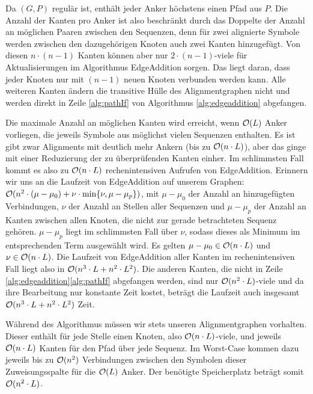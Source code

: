 \begin{beweis}
	Da $(G,P)$ regulär ist, enthält jeder Anker höchstens einen Pfad aus $P$. Die Anzahl der Kanten pro Anker ist also beschränkt durch das Doppelte der Anzahl an möglichen Paaren zwischen den Sequenzen, denn für zwei alignierte Symbole werden zwischen den dazugehörigen Knoten auch zwei Kanten hinzugefügt. Von diesen $n\cdot (n-1)$ Kanten können aber nur $2\cdot (n-1)$-viele für Aktualisierungen im Algorithmus \textrm{EdgeAddition} sorgen. Das liegt daran, dass jeder Knoten nur mit $(n-1)$ neuen Knoten verbunden werden kann. Alle weiteren Kanten ändern die transitive Hülle des Alignmentgraphen nicht und werden direkt in Zeile \ref{alg:pathIf} von Algorithmus \ref{alg:edgeaddition} abgefangen.
	
	Die maximale Anzahl an möglichen Kanten wird erreicht, wenn $\mathcal{O}(L)$ Anker vorliegen, die jeweils Symbole aus möglichst vielen Sequenzen enthalten. Es ist gibt zwar Alignments mit deutlich mehr Ankern (bis zu $\mathcal{O}(n\cdot L)$), aber das ginge mit einer Reduzierung der zu überprüfenden Kanten einher. Im schlimmsten Fall kommt es also zu $\mathcal{O}(n\cdot L)$ rechenintensiven Aufrufen von \textrm{EdgeAddition}. Erinnern wir uns an die Laufzeit von \textrm{EdgeAddition} auf unserem Graphen: $\mathcal{O}(n^2 \cdot (\mu - \mu_0) + \nu \cdot \min\{\nu, \mu - \mu_p\})$, mit $\mu - \mu_0$ der Anzahl an hinzugefügten Verbindungen, $\nu$ der Anzahl an Stellen aller Sequenzen und $\mu - \mu_p$ der Anzahl an Kanten zwischen allen Knoten, die nicht zur gerade betrachteten Sequenz gehören. $\mu - \mu_p$ liegt im schlimmsten Fall über $\nu$, sodass dieses als Minimum im entsprechenden Term ausgewählt wird. Es gelten $\mu - \mu_0 \in \mathcal{O}(n\cdot L)$ und $\nu \in \mathcal{O}(n\cdot L)$. Die Laufzeit von \textrm{EdgeAddition} aller Kanten im rechenintensiven Fall liegt also in $\mathcal{O}(n^3\cdot L + n^2\cdot L^2)$. Die anderen Kanten, die nicht in Zeile \ref{alg:edgeaddition}\ref{alg:pathIf} abgefangen werden, sind nur $\mathcal{O}(n^2\cdot L)$-viele und da ihre Bearbeitung nur konstante Zeit kostet, beträgt die Laufzeit auch insgesamt $\mathcal{O}(n^3\cdot L + n^2\cdot L^2)$ Zeit.
	
	Während des Algorithmus müssen wir stets unseren Alignmentgraphen vorhalten. Dieser enthält für jede Stelle einen Knoten, also $\mathcal{O}(n\cdot L)$-viele, und jeweils $\mathcal{O}(n\cdot L)$ Kanten für den Pfad über jede Sequenz. Im Worst-Case kommen dazu jeweils bis zu $\mathcal{O}(n^2)$ Verbindungen zwischen den Symbolen dieser Zuweisungsspalte für die $\mathcal{O}(L)$ Anker. Der benötigte Speicherplatz beträgt somit $\mathcal{O}(n^2\cdot L)$.  
\end{beweis}

